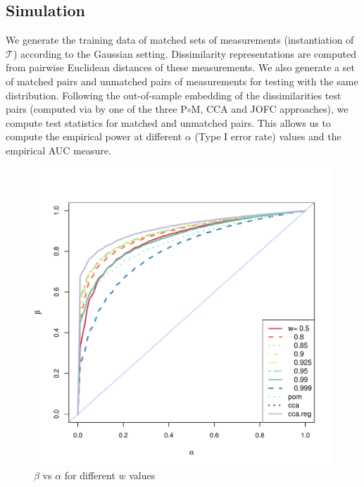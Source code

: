 \documentclass[12pt]{article} %
\begin{document}
\subsection{Simulation\label{subsec:sim}}

We generate the training data of matched sets of measurements (instantiation of $\mathcal{T}$) according to  the Gaussian setting. Dissimilarity representations are computed from pairwise Euclidean distances of these measurements. We also generate a set of matched pairs and unmatched pairs of measurements for testing with the same distribution. Following the out-of-sample embedding of the dissimilarities test pairs (computed via by one of the three P$\circ $M, CCA and JOFC approaches), we compute test statistics  for matched and unmatched pairs. This allows us to compute the empirical power  at different $\alpha$ (Type I error rate) values and the empirical AUC measure.


\begin{figure}[h]
     \centering
\includegraphics[scale=0.35]{MVN-FC-Tradeoff-OOS-c0.pdf}
\caption{$\beta$ vs $\alpha$  for different $w$ values }
\label{fig:MVN-c0-power-alpha}
\end{figure}
\end{document}
